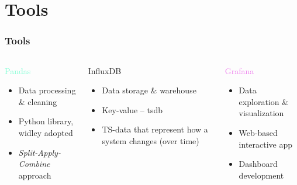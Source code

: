 \section{Tools}
\begin{frame}
    \frametitle{Tools}
    \vspace*{\fill}
    \begin{columns}[onlytextwidth, t]
        \begin{column}{.33\textwidth}
            \centering
            \textcolor{Aquamarine}{\Large Pandas}
            \vspace{0.5cm}

            \begin{itemize}
                \item Data processing \& cleaning
                \item Python library, widley adopted
                \item \textit{Split-Apply-Combine} approach
            \end{itemize}
        \end{column}

        \begin{column}{.33\textwidth}
            \centering
            \textcolor{YellowOrange}{\Large InfluxDB}
            \vspace{0.5cm}

            \begin{itemize}
                \item Data storage \& warehouse
                \item Key-value -- \acl{tsdb}
                \item TS-data that represent how a system changes (over time)
            \end{itemize}
        \end{column}


        \begin{column}{.33\textwidth}
            \centering
            \textcolor{violet}{\Large Grafana}
            \vspace{0.5cm}

            \begin{itemize}
                \item Data exploration \& visualization
                \item Web-based interactive app
                \item Dashboard development
            \end{itemize}
        \end{column}
    \end{columns}
    \vspace*{\fill}
\end{frame}